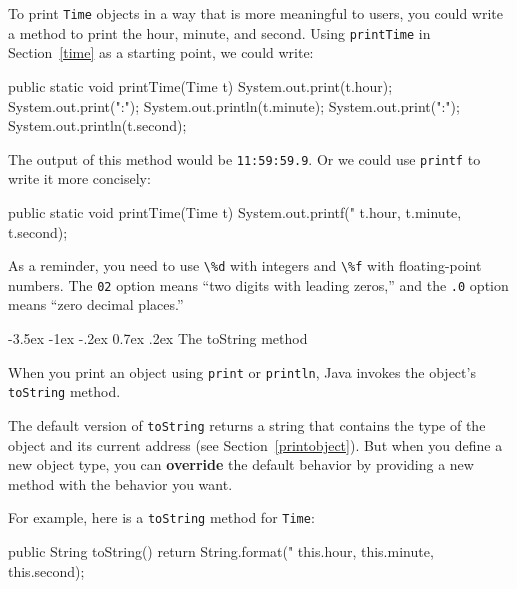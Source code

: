 \documentclass[12pt]{book}
\makeatletter
\theoremstyle{exercise}
\newcommand{\java}[1]{\verb"#1"}
\renewcommand{\section}{\@startsection{section}{1}{\z@}%
    {-3.5ex \@plus -1ex \@minus -.2ex}%
    {0.7ex \@plus.2ex}%
    {\normalfont\Large\bfseries}}
\newcommand{\java}[1]{\lstinline{#1}} %
\makeatother
\begin{document}
To print \java{Time} objects in a way that is more meaningful to users, you could write a method to print the hour, minute, and second.
Using \java{printTime} in Section~\ref{time} as a starting point, we could write:

\begin{code}
    public static void printTime(Time t) {
        System.out.print(t.hour);
        System.out.print(":");
        System.out.println(t.minute);
        System.out.print(":");
        System.out.println(t.second);
    }
\end{code}

The output of this method would be {\tt 11:59:59.9}.
Or we could use \java{printf} to write it more concisely:

\begin{code}
    public static void printTime(Time t) {
        System.out.printf("%
            t.hour, t.minute, t.second);
    }
\end{code}

As a reminder, you need to use \java{\%d} with integers and \java{\%f} with floating-point numbers.
The \java{02} option means ``two digits with leading zeros,'' and the \java{.0} option means ``zero decimal places.''


\section{The toString method}


When you print an object using \java{print} or \java{println}, Java invokes the object's \java{toString} method.


The default version of \java{toString} returns a string that contains the type of the object and its current address (see Section~\ref{printobject}).
But when you define a new object type, you can {\bf override} the default behavior by providing a new method with the behavior you want.

For example, here is a \java{toString} method for \java{Time}:

\begin{code}
public String toString() {
    return String.format("%
            this.hour, this.minute, this.second);
}
\end{code}
\end{document}
